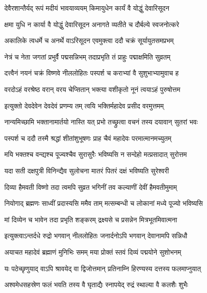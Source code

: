 \twolineshloka
{देवैरशान्तैर्यद् रूपं मदीयं भावयाव्ययम्}
{किमायुधेन कार्यं वै योद्धुं देवारिसूदन}%

\twolineshloka
{क्षमा युधि न कार्या वै योद्धुं देवारिसूदन}
{अनागते व्यतीते च दौर्बल्ये स्वजनोत्करे}%

\twolineshloka
{अकालिके त्वधर्मे च अनर्थे वाऽरिसूदन}
{एवमुक्त्वा ददौ चक्रं सूर्यायुतसमप्रभम्}%

\twolineshloka
{नेत्रं च नेता जगतां प्रभुर्वै पद्मसन्निभम्}
{तदाप्रभृति तं प्राहुः पद्माक्षमिति सुव्रतम्}%

\twolineshloka
{दत्त्वैनं नयनं चक्रं विष्णवे नीललोहितः}
{पस्पर्श च कराभ्यां वै सुशुभाभ्यामुवाच ह}%

\twolineshloka
{वरदोऽहं वरश्रेष्ठ वरान् वरय चेप्सितान्}
{भक्त्या वशीकृतो नूनं त्वयाऽहं पुरुषोत्तम}%

\twolineshloka
{इत्युक्तो देवदेवेन देवदेवं प्रणम्य तम्}
{त्वयि भक्तिर्महादेव प्रसीद वरमुत्तमम्}%

\twolineshloka
{नान्यमिच्छामि भक्तानामार्तयो नास्ति यत् प्रभो}
{तच्छ्रुत्वा वचनं तस्य दयावान् सुतरां भवः}%

\twolineshloka
{पस्पर्श च ददौ तस्मै श्रद्धां शीतांशुभूषणः}
{प्राह चैवं महादेवः परमात्मानमच्युतम्}%

\twolineshloka
{मयि भक्तश्च वन्द्यश्च पूज्यश्चैव सुरासुरैः}
{भविष्यसि न सन्देहो मत्प्रसादात् सुरोत्तम}%

\twolineshloka
{यदा सती दक्षपुत्री विनिन्द्यैव सुलोचना}
{मातरं पितरं दक्षं भविष्यति सुरेश्वरी}%

\twolineshloka
{दिव्या हैमवती विष्णो तदा त्वमपि सुव्रत}
{भगिनीं तव कल्याणीं देवीं हैमवतीमुमाम्}%

\twolineshloka
{नियोगाद् ब्रह्मणः साध्वीं प्रदास्यसि ममैव ताम्}
{मत्सम्बन्धी च लोकानां मध्ये पूज्यो भविष्यसि}%

\twolineshloka
{मां दिव्येन च भावेन तदा प्रभृति शङ्करम्}
{द्रक्ष्यसे च प्रसन्नेन मित्रभूतमिवात्मना}%

\twolineshloka
{इत्युक्त्वाऽन्तर्दधे रुद्रो भगवान् नीललोहितः}
{जनार्दनोऽपि भगवान् देवानामपि सन्निधौ}%

\twolineshloka
{अयाचत महादेवं ब्रह्माणं मुनिभिः समम्}
{मया प्रोक्तं स्तवं दिव्यं पद्मयोने सुशोभनम्}%

\twolineshloka
{यः पठेच्छृणुयाद् वाऽपि श्रावयेद् वा द्विजोत्तमान्}
{प्रतिनाम्नि हिरण्यस्य दत्तस्य फलमाप्नुयात्}%

\twolineshloka
{अश्वमेधसहस्रेण फलं भवति तस्य वै}
{घृताद्यैः स्नापयेद् रुद्रं स्थाल्या वै कलशैः शुभैः}%

